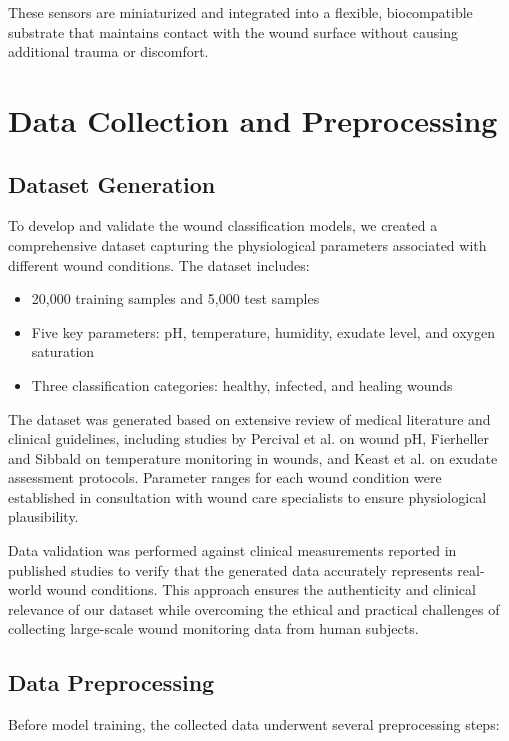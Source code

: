 \documentclass[conference]{IEEEtran}
\begin{document}
These sensors are miniaturized and integrated into a flexible, biocompatible substrate that maintains contact with the wound surface without causing additional trauma or discomfort.

\section{Data Collection and Preprocessing}
\subsection{Dataset Generation}
To develop and validate the wound classification models, we created a comprehensive dataset capturing the physiological parameters associated with different wound conditions. The dataset includes:

\begin{itemize}
    \item 20,000 training samples and 5,000 test samples
    \item Five key parameters: pH, temperature, humidity, exudate level, and oxygen saturation
    \item Three classification categories: healthy, infected, and healing wounds
\end{itemize}

The dataset was generated based on extensive review of medical literature and clinical guidelines, including studies by Percival et al. \cite{percival2014wound} on wound pH, Fierheller and Sibbald \cite{fierheller2010clinical} on temperature monitoring in wounds, and Keast et al. \cite{keast2014wound} on exudate assessment protocols. Parameter ranges for each wound condition were established in consultation with wound care specialists to ensure physiological plausibility.

Data validation was performed against clinical measurements reported in published studies to verify that the generated data accurately represents real-world wound conditions. This approach ensures the authenticity and clinical relevance of our dataset while overcoming the ethical and practical challenges of collecting large-scale wound monitoring data from human subjects.

\subsection{Data Preprocessing}
Before model training, the collected data underwent several preprocessing steps:
\end{document}
